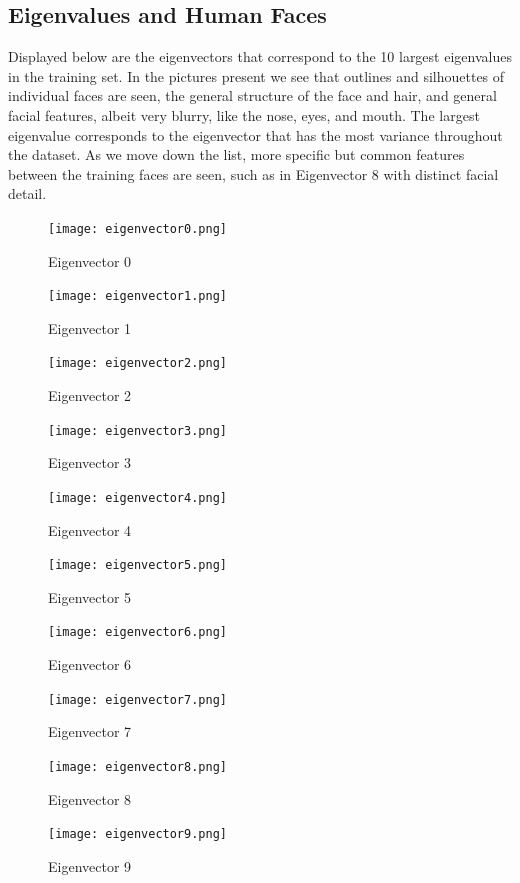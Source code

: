 \documentclass{article}
\begin{document}
\subsection{Eigenvalues and Human Faces}

Displayed below are the eigenvectors that correspond to the 10 largest eigenvalues in the training set. In the pictures present we see that outlines and silhouettes of individual faces are seen, the general structure of the face and hair, and general facial features, albeit very blurry, like the nose, eyes, and mouth. The largest eigenvalue corresponds to the eigenvector that has the most variance throughout the dataset. As we move down the list, more specific but common features between the training faces are seen, such as in Eigenvector 8 with distinct facial detail.

\begin{figure}[!htb]
   \begin{minipage}{0.48\textwidth}
     \centering
      \texttt{[image: eigenvector0.png]}
    \caption{Eigenvector 0}
   \end{minipage}\hfill
   \begin{minipage}{0.48\textwidth}
     \centering
     \texttt{[image: eigenvector1.png]}
     \caption{Eigenvector 1}
   \end{minipage}
   \begin{minipage}{0.48\textwidth}
     \centering
     \texttt{[image: eigenvector2.png]}
     \caption{Eigenvector 2}
   \end{minipage}
   \begin{minipage}{0.48\textwidth}
     \centering
     \texttt{[image: eigenvector3.png]}
     \caption{Eigenvector 3}
   \end{minipage}
   \begin{minipage}{0.48\textwidth}
     \centering
     \texttt{[image: eigenvector4.png]}
     \caption{Eigenvector 4}
   \end{minipage}
      \begin{minipage}{0.48\textwidth}
     \centering
     \texttt{[image: eigenvector5.png]}
     \caption{Eigenvector 5}
   \end{minipage}
      \begin{minipage}{0.48\textwidth}
     \centering
     \texttt{[image: eigenvector6.png]}
     \caption{Eigenvector 6}
   \end{minipage}
      \begin{minipage}{0.48\textwidth}
     \centering
     \texttt{[image: eigenvector7.png]}
     \caption{Eigenvector 7}
   \end{minipage}
      \begin{minipage}{0.48\textwidth}
     \centering
     \texttt{[image: eigenvector8.png]}
     \caption{Eigenvector 8}
   \end{minipage}
      \begin{minipage}{0.48\textwidth}
     \centering
     \texttt{[image: eigenvector9.png]}
     \caption{Eigenvector 9}
   \end{minipage}
\end{figure}
\end{document}
